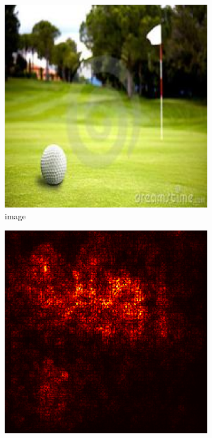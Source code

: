 \documentclass[preprint,12pt]{elsarticle}
\begin{document}
\begin{figure}
    \centering
    \begin{subfigure}{0.14\linewidth}
        \centering
        \includegraphics[width=\linewidth]{../visualizations/examples/imagenette/resnet18/images/5.png}
        \caption{image}
    \end{subfigure}
    \hfill
    \begin{subfigure}{0.14\linewidth}
        \centering
        \includegraphics[width=\linewidth]{../visualizations/examples/imagenette/resnet18/saliency_map/5.png}

\end{subfigure}
\end{figure}
\end{document}
